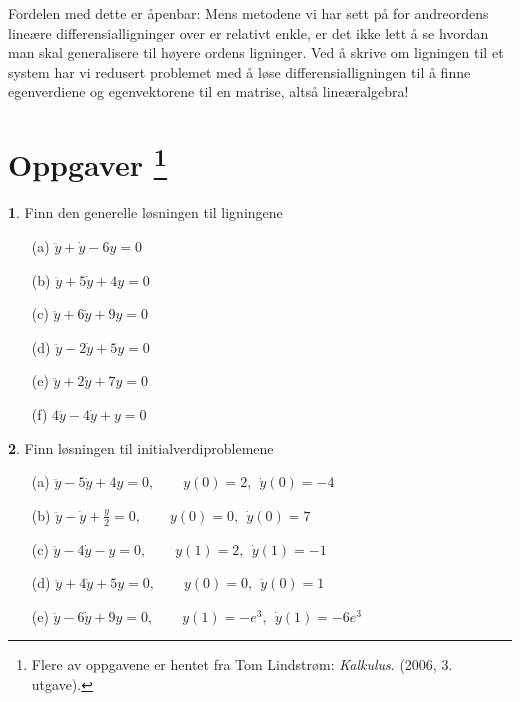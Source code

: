\documentclass{article}
\theoremstyle{definition}
\newtheorem{oppg}{}
\theoremstyle{remark}
\begin{document}
\begin{multicols*}{2}
Fordelen med dette er åpenbar: Mens metodene vi har sett på for andreordens lineære differensialligninger over er relativt enkle, er det ikke lett å se hvordan man skal generalisere til høyere ordens ligninger. Ved å skrive om ligningen til et system har vi redusert problemet med å løse differensialligningen til å finne egenverdiene og egenvektorene til en matrise, altså lineæralgebra!

\newpage

\section*{Oppgaver \footnote{Flere av oppgavene er hentet fra Tom Lindstrøm: \textit{Kalkulus}. (2006, 3. utgave).}}

\begin{oppg}
  Finn den generelle løsningen til ligningene
  \begin{multicols*}{2}
    \begin{itemize}
      \item[(a)] $\ddot{y} + \dot{y} - 6 y = 0$
      \item[(b)] $\ddot{y} + 5\dot{y} + 4y = 0$
      \item[(c)] $\ddot{y} + 6\dot{y} + 9y = 0$
      \item[(d)] $\ddot{y} - 2\dot{y} + 5y = 0$
      \item[(e)] $\ddot{y} + 2\dot{y} + 7y = 0$
      \item[(f)] $4\ddot{y} - 4\dot{y} + y = 0$  
    \end{itemize}
  \end{multicols*}
\end{oppg}

\begin{oppg}
  Finn løsningen til initialverdiproblemene
  \begin{itemize}
    \item[(a)] $\ddot{y} - 5\dot{y} + 4y = 0, \qquad y(0) = 2,\ \ \dot{y}(0) = -4$
    \item[(b)] $\ddot{y} - \dot{y} + \frac{y}{2} = 0, \qquad y(0) = 0,\ \ \dot{y}(0) = 7$
    \item[(c)] $\ddot{y} - 4\dot{y} - y = 0, \qquad y(1) = 2,\ \ \dot{y}(1) = -1$
    \item[(d)] $\ddot{y} + 4\dot{y} + 5y = 0, \qquad y(0) = 0,\ \ \dot{y}(0) = 1$
    \item[(e)] $\ddot{y} - 6\dot{y} + 9y = 0, \qquad y(1) = -e^3,\ \ \dot{y}(1) = -6e^3$
  \end{itemize}
\end{oppg}


\end{multicols*}
\end{document}
